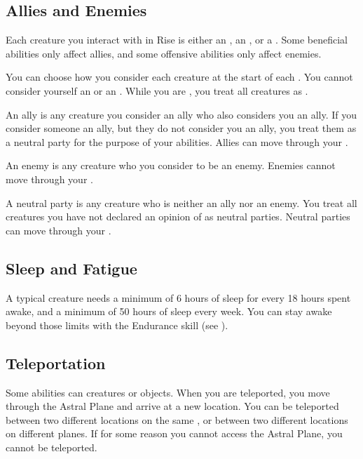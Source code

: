     \subsection{Allies and Enemies}\label{Allies and Enemies}
        Each creature you interact with in Rise is either an , an , or a .
        Some beneficial abilities only affect allies, and some offensive abilities only affect enemies.

        You can choose how you consider each creature at the start of each .
        You cannot consider yourself an  or an .
        While you are , you treat all creatures as .

         An ally is any creature you consider an ally who also considers you an ally.
        If you consider someone an ally, but they do not consider you an ally, you treat them as a neutral party for the purpose of your abilities.
        Allies can move through your .

         An enemy is any creature who you consider to be an enemy.
        Enemies cannot move through your .

         A neutral party is any creature who is neither an ally nor an enemy.
        You treat all creatures you have not declared an opinion of as neutral parties.
        Neutral parties can move through your .

    \subsection{Sleep and Fatigue}\label{Sleep and Fatigue}
        A typical creature needs a minimum of 6 hours of sleep for every 18 hours spent awake, and a minimum of 50 hours of sleep every week.
        You can stay awake beyond those limits with the Endurance skill (see ).

    \subsection{Teleportation}\label{Teleportation}
        Some abilities can  creatures or objects.
        When you are teleported, you move through the Astral Plane and arrive at a new location.
        You can be teleported between two different locations on the same , or between two different locations on different planes.
        If for some reason you cannot access the Astral Plane, you cannot be teleported.


